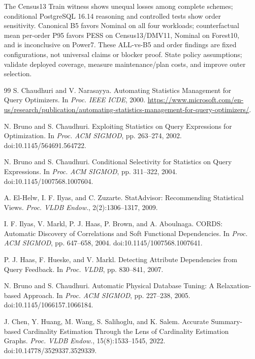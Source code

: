 \documentclass[sigconf, nonacm]{acmart}
\begin{document}
The Census13 Train witness shows unequal losses among complete
schemes; conditional PostgreSQL 16.14 reasoning and controlled tests
show order sensitivity. Canonical B5 favors Nominal on all four
workloads; counterfactual mean per-order P95 favors PESS on
Census13/DMV11, Nominal on Forest10, and is inconclusive on Power7.
These ALL-vs-B5 and order findings are fixed configurations, not
universal claims or blocker proof. State policy assumptions; validate
deployed coverage, measure maintenance/plan costs, and improve outer
selection.

\begin{thebibliography}{99}
S. Chaudhuri and V. Narasayya.
Automating Statistics Management for Query Optimizers.
In \emph{Proc. IEEE ICDE}, 2000.
\url{https://www.microsoft.com/en-us/research/publication/automating-statistics-management-for-query-optimizers/}.

N. Bruno and S. Chaudhuri.
Exploiting Statistics on Query Expressions for Optimization.
In \emph{Proc. ACM SIGMOD}, pp. 263--274, 2002.
doi:10.1145/564691.564722.

N. Bruno and S. Chaudhuri.
Conditional Selectivity for Statistics on Query Expressions.
In \emph{Proc. ACM SIGMOD}, pp. 311--322, 2004.
doi:10.1145/1007568.1007604.

A. El-Helw, I. F. Ilyas, and C. Zuzarte.
StatAdvisor: Recommending Statistical Views.
\emph{Proc. VLDB Endow.}, 2(2):1306--1317, 2009.

I. F. Ilyas, V. Markl, P. J. Haas, P. Brown, and A. Aboulnaga.
CORDS: Automatic Discovery of Correlations and Soft Functional Dependencies.
In \emph{Proc. ACM SIGMOD}, pp. 647--658, 2004.
doi:10.1145/1007568.1007641.

P. J. Haas, F. Hueske, and V. Markl.
Detecting Attribute Dependencies from Query Feedback.
In \emph{Proc. VLDB}, pp. 830--841, 2007.

N. Bruno and S. Chaudhuri.
Automatic Physical Database Tuning: A Relaxation-based Approach.
In \emph{Proc. ACM SIGMOD}, pp. 227--238, 2005.
doi:10.1145/1066157.1066184.

J. Chen, Y. Huang, M. Wang, S. Salihoglu, and K. Salem.
Accurate Summary-based Cardinality Estimation Through the Lens
of Cardinality Estimation Graphs.
\emph{Proc. VLDB Endow.}, 15(8):1533--1545, 2022.
doi:10.14778/3529337.3529339.


\end{thebibliography}
\end{document}
